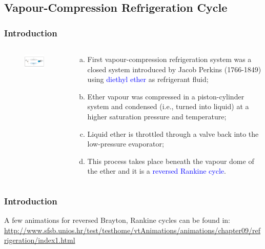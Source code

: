 \documentclass[10pt,compress]{beamer}
\begin{document}
\subsection{Vapour-Compression Refrigeration Cycle}
\begin{frame}
 \frametitle{Introduction}
  \begin{columns}
   \begin{column}[c]{0.5\linewidth}
    \begin{figure}%
     \begin{center}
      \includegraphics[width=5.8cm,clip]{./Pics/Overview_Refrig12}
     \end{center}
    \end{figure}  
   \end{column}  
   \begin{column}[c]{0.5\linewidth}
  \begin{enumerate}[(a)]
   \item <1-> First vapour-compression refrigeration system was a closed system introduced by Jacob Perkins (1766-1849) using \textcolor{blue}{diethyl ether} as refrigerant fluid;
   \item <2-> Ether vapour was compressed in a piston-cylinder system and condensed (i.e., turned into liquid) at a higher saturation pressure and temperature;
   \item <3-> Liquid ether is throttled through a valve back into the low-pressure evaporator;
   \item <4-> This process takes place beneath the vapour dome of the ether and it is a \textcolor{blue}{reversed Rankine cycle}.
  \end{enumerate}
 \end{column}  
\end{columns}
\end{frame}


\begin{frame}
 \frametitle{Introduction}

  A few animations for reversed Brayton, Rankine cycles can be found in:
\href{http://www.sfsb.unios.hr/test/testhome/vtAnimations/animations/chapter09/refrigeration/index1.html}{\tiny{http://www.sfsb.unios.hr/test/testhome/vtAnimations/animations/chapter09/refrigeration/index1.html}}


\end{frame}
\end{document}
